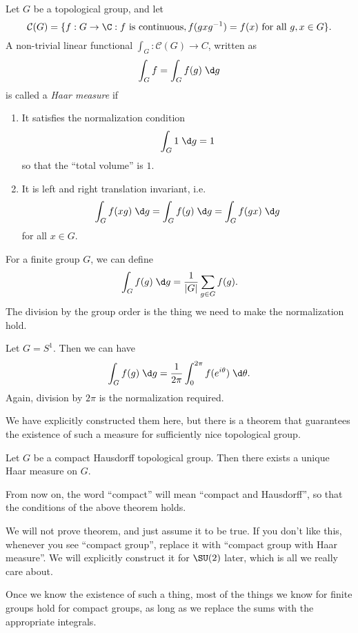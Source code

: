 \documentclass[a4paper]{article}
\begin{document}
\begin{defi}
  Let $G$ be a topological group, and let
  \[
    \mathcal{C}(G) = \{f: G \to \C: f\text{ is continuous}, f(gxg^{-1}) = f(x)\text{ for all }g, x \in G\}.
  \]
  A non-trivial linear functional $\int_G: \mathcal{C}(G) \to C$, written as
  \[
    \int_G f = \int_G f(g) \;\d g
  \]
  is called a \emph{Haar measure} if
  \begin{enumerate}
    \item It satisfies the normalization condition
      \[
        \int_G 1 \;\d g = 1
      \]
      so that the ``total volume'' is $1$.
    \item It is left and right translation invariant, i.e.
      \[
        \int_G f(xg)\;\d g = \int_G f(g)\;\d g = \int_G f(gx) \;\d g
      \]
      for all $x \in G$.
  \end{enumerate}
\end{defi}

\begin{eg}
  For a finite group $G$, we can define
  \[
    \int_G f(g)\;\d g = \frac{1}{|G|} \sum_{g \in G} f(g).
  \]
  The division by the group order is the thing we need to make the normalization hold.
\end{eg}

\begin{eg}
  Let $G = S^1$. Then we can have
  \[
    \int_G f(g)\;\d g = \frac{1}{2\pi} \int_0^{2\pi} f(e^{i\theta})\;\d \theta.
  \]
  Again, division by $2\pi$ is the normalization required.
\end{eg}

We have explicitly constructed them here, but there is a theorem that guarantees the existence of such a measure for sufficiently nice topological group.

\begin{thm}
  Let $G$ be a compact Hausdorff topological group. Then there exists a unique Haar measure on $G$.
\end{thm}
From now on, the word ``compact'' will mean ``compact and Hausdorff'', so that the conditions of the above theorem holds.

We will not prove theorem, and just assume it to be true. If you don't like this, whenever you see ``compact group'', replace it with ``compact group with Haar measure''. We will explicitly construct it for $\SU(2)$ later, which is all we really care about.

Once we know the existence of such a thing, most of the things we know for finite groups hold for compact groups, as long as we replace the sums with the appropriate integrals.
\end{document}

